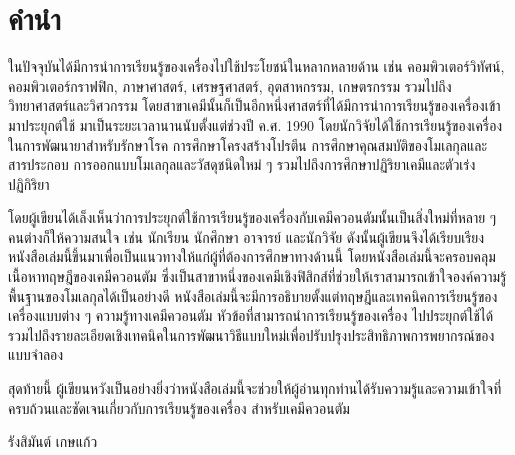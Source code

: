 

{

\chapter*{\centering คำนำ}

ในปัจจุบันได้มีการนำการเรียนรู้ของเครื่องไปใช้ประโยชน์ในหลากหลายด้าน เช่น คอมพิวเตอร์วิทัศน์, คอมพิวเตอร์กราฟฟิก, ภาษาศาสตร์, เศรษฐศาสตร์, 
อุตสาหกรรม, เกษตรกรรม รวมไปถึงวิทยาศาสตร์และวิศวกรรม โดยสาขาเคมีนั้นก็เป็นอีกหนึ่งศาสตร์ที่ได้มีการนำการเรียนรู้ของเครื่องเข้ามาประยุกต์ใช้%
มาเป็นระยะเวลานานนับตั้งแต่ช่วงปี ค.ศ. 1990 โดยนักวิจัยได้ใช้การเรียนรู้ของเครื่องในการพัฒนายาสำหรับรักษาโรค การศึกษาโครงสร้างโปรตีน 
การศึกษาคุณสมบัติของโมเลกุลและสารประกอบ การออกแบบโมเลกุลและวัสดุชนิดใหม่ ๆ รวมไปถึงการศึกษาปฏิริยาเคมีและตัวเร่งปฏิกิริยา

โดยผู้เขียนได้เล็งเห็นว่าการประยุกต์ใช้การเรียนรู้ของเครื่องกับเคมีควอนตัมนั้นเป็นสิ่งใหม่ที่หลาย ๆ คนต่างก็ให้ความสนใจ เช่น นักเรียน นักศึกษา 
อาจารย์ และนักวิจัย ดังนั้นผู้เขียนจึงได้เรียบเรียงหนังสือเล่มนี้ขึ้นมาเพื่อเป็นแนวทางให้แก่ผู้ที่ต้องการศึกษาทางด้านนี้ โดยหนังสือเล่มนี้จะครอบคลุม%
เนื้อหาทฤษฎีของเคมีควอนตัม ซึ่งเป็นสาขาหนึ่งของเคมีเชิงฟิสิกส์ที่ช่วยให้เราสามารถเข้าใจองค์ความรู้พื้นฐานของโมเลกุลได้เป็นอย่างดี 
หนังสือเล่มนี้จะมีการอธิบายตั้งแต่ทฤษฎีและเทคนิคการเรียนรู้ของเครื่องแบบต่าง ๆ ความรู้ทางเคมีควอนตัม หัวข้อที่สามารถนำการเรียนรู้ของเครื่อง%
ไปประยุกต์ใช้ได้ รวมไปถึงรายละเอียดเชิงเทคนิคในการพัฒนาวิธีแบบใหม่เพื่อปรับปรุงประสิทธิภาพการพยากรณ์ของแบบจำลอง

สุดท้ายนี้ ผู้เขียนหวังเป็นอย่างยิ่งว่าหนังสือเล่มนี้จะช่วยให้ผู้อ่านทุกท่านได้รับความรู้และความเข้าใจที่ครบถ้วนและชัดเจนเกี่ยวกับการเรียนรู้ของเครื่อง%
สำหรับเคมีควอนตัม

\medskip

\begin{flushright}
รังสิมันต์ เกษแก้ว
\end{flushright}
}
